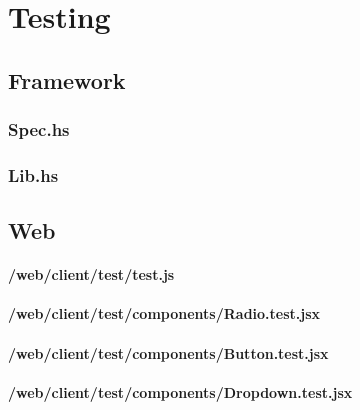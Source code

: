 \chapter{Testing}
\label{app:testing}

\section{Framework}\label{app:testing_framework}

\subsection{Spec.hs}


\subsection{Lib.hs}




\section{Web}
\label{app:testing_web}

\subsubsection{/web/client/test/test.js}
\label{app:web_test_js}


\subsubsection{/web/client/test/components/Radio.test.jsx}
\label{app:web_Radio_test_jsx}


\subsubsection{/web/client/test/components/Button.test.jsx}
\label{app:web_Button_test_jsx}


\subsubsection{/web/client/test/components/Dropdown.test.jsx}
\label{app:web_Dropdown_test_jsx}

